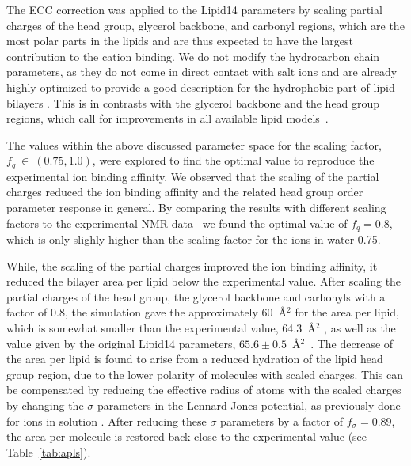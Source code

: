 \documentclass[aip,jcp,twocolumn]{revtex4}
\begin{document}
The ECC correction was applied to the Lipid14 parameters by scaling partial charges of the head group,
glycerol backbone, and carbonyl regions, which are the most polar parts in the  lipids and
are thus expected to have the largest contribution to the cation binding.
We do not modify the hydrocarbon chain parameters, as they
do not come in direct contact with salt ions and are
already highly optimized to provide a good description for the
hydrophobic part of lipid bilayers \cite{dickson14,ollila16}.
This is in contrasts with the glycerol backbone and the head group regions, 
which call for improvements in all available lipid models~\cite{botan15}.

The values within the above discussed parameter space for the scaling factor, $f_q~\in~(0.75, 1.0)$,
were explored to find the optimal value to reproduce the experimental ion binding affinity.
We observed that the scaling
of the partial charges reduced the ion binding affinity and the 
related head group order parameter response in general.
By comparing the results with different scaling factors to the experimental 
NMR data~\cite{akutsu81,altenbach84,scherer89} we found the optimal 
value of $f_q = 0.8$,
which is only slighly higher than the scaling factor for the ions in water 0.75.

While, the scaling of the partial charges improved the ion binding affinity,
it reduced the bilayer area per lipid below the experimental value. 
After scaling the partial charges of the head group, the glycerol
backbone and carbonyls with a factor of 0.8, the simulation gave 
the approximately 60~\AA$^2$ for the area per lipid,
which is somewhat smaller than the experimental value, 64.3~\AA$^2$ \cite{kucerka11}, 
as well as the value given by the original Lipid14 parameters, $65.6 \pm 0.5$~\AA$^2$~\cite{dickson14}.
The decrease of the area per lipid is found to arise from a reduced hydration of the lipid head group region,
due to the lower polarity of molecules with scaled charges. This can be compensated
by reducing the effective radius of atoms with the scaled charges by changing 
the $\sigma$ parameters in the Lennard-Jones potential, 
as previously done for ions in solution \cite{kohagen14,kohagen16,Pluharova2014}.
After reducing these $\sigma$ parameters by a factor of $f_\sigma = 0.89$, the area per molecule is restored
back close to the experimental value (see Table~\ref{tab:apls}). 
\end{document}
